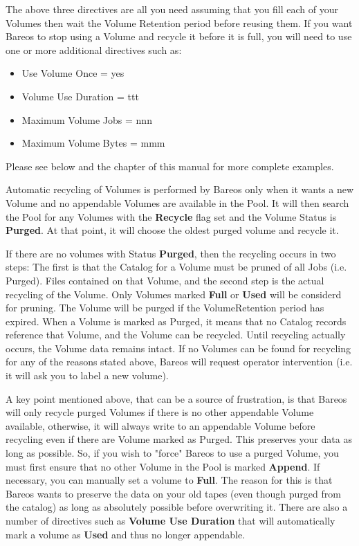 The above three directives are all you need assuming that you fill
each of your Volumes then wait the Volume Retention period before
reusing them.  If you want Bareos to stop using a Volume and recycle
it before it is full, you will need to use one or more additional
directives such as:
\begin{itemize}
\item Use Volume Once = yes
\item Volume Use Duration = ttt
\item Maximum Volume Jobs = nnn
\item Maximum Volume Bytes = mmm
\end{itemize}
Please see below and
the  chapter
of this manual for more complete examples.

Automatic recycling of Volumes is performed by Bareos only when it wants a
new Volume and no appendable Volumes are available in the Pool. It will then
search the Pool for any Volumes with the {\bf Recycle} flag set and the
Volume Status is {\bf Purged}. At that point, it will choose the oldest
purged volume and recycle it.

If there are no volumes with Status {\bf Purged}, then
the recycling occurs in two steps:
The first is that the Catalog for a Volume must be pruned of all Jobs (i.e.
Purged).  Files contained on that Volume, and the second step is the actual
recycling of the Volume.  Only Volumes marked {\bf Full} or {\bf Used} will
be considerd for pruning.  The Volume will be purged if the VolumeRetention
period has expired.  When a Volume is marked as Purged, it means that no
Catalog records reference that Volume, and the Volume can be recycled.
Until recycling actually occurs, the Volume data remains intact.  If no
Volumes can be found for recycling for any of the reasons stated above,
Bareos will request operator intervention (i.e.  it will ask you to label a
new volume).

A key point mentioned above, that can be a source of frustration, is that Bareos
will only recycle purged Volumes if there is no other appendable Volume
available, otherwise, it will always write to an appendable Volume before
recycling even if there are Volume marked as Purged. This preserves your data
as long as possible. So, if you wish to "force" Bareos to use a purged
Volume, you must first ensure that no other Volume in the Pool is marked {\bf
Append}. If necessary, you can manually set a volume to {\bf Full}. The reason
for this is that Bareos wants to preserve the data on your old tapes (even
though purged from the catalog) as long as absolutely possible before
overwriting it. There are also a number of directives such as
{\bf Volume Use Duration} that will automatically mark a volume as {\bf
Used} and thus no longer appendable.

